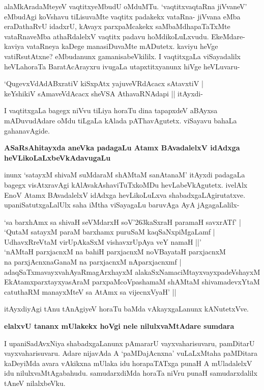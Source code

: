 alaMkAradaMteyeV vaqtitxyeMbudU oMduMTu. `vaqtitxvaqtaRna jiVvaneV' eMbudAgi koVshavu tiLisuvaMte vaqtitx padakekx vataRna- jiVvana eMba eraDathaRvU idadxrU, kAvayx parxpaMcakekx saMbaMdhapaTaTxMte vataRnaveMba athaRdalelxV vaqtitx padavu hoMdikoLuLxvudu. EkeMdare- kaviya vataRneya kaDege manasiDuvaMte mADutetx. kaviyu heVge vatiRsutAtxne? eMbudanunx gamanisabeVkililx. I vaqtitxgaLa viSayadalilx heVLahoraTa BaratAcArayxru ivugaLa utapxtitxyanunx hiVge heVLuvaru-

\begin{shloka}
`QugevxVdAdABxratiV kiSxpAtx yajuveVRdAcacx sAtavxtiV |\\
keYshikiV sAmaveVdAcacx sheVSA AthavaRNAdapi || itAyxdi-
\end{shloka}

I vaqtitxgaLa bagegx niVvu tiLiya horaTu dina tapapxdeV aBAyxsa mADuvudAdare oMdu tiLgaLa kAlada pAThavAgutetx. viSayavu bahaLa gahanavAgide.

{\bf ASaRsAhitayxda aneVka padagaLu Atamx BAvadalelxV idAdxga heVLikoLaLxbeVkAdavugaLu}

inunx `satayxM shivaM suMdaraM shAMtaM sanAtanaM' itAyxdi padagaLa bagegx visAtxravAgi kAlAvakAshaviTuTxkoMDu hevLabeVkAgutetx. ivelAlx EnoV Atamx BAvadalelxV idAdxga hevLikoLuLxva shabadxgaLAgirutatxve. upaniSatutxgaLalUlx saha iMtha viSayagaLu baruvAga AyA jAgagaLalilx-

\begin{shloka}
`sa barxhAmx sa shivaH seVMdarxH soV\char'263kaSxraH paramaH savxrATf' |\\
`QutaM satayxM paraM barxhamx puruSaM kaqSaNxpiMgaLamf |\\
UdhavxRreVtaM virUpAkaSxM vishavxrUpAya veY namaH ||'\\
`nAMtaH parxjacnxM na bahiH parxjacnxM noVBayataH parxjacnxM \\
na parxjAcnxnaGanaM na parxjacnxM nAparxjacnxmf |\\
adaqSaTxmavayxvahAyaRmagArxhayxM alakaSxNamaciMtayxvayxpadeVshayxM \\
EkAtamxparxtayxyasAraM parxpaMcoVpashamaM shAMtaM shivamadevxYtaM \\
catuthaRM manayxMteV sa AtAmx sa vijecnxVyaH' ||
\end{shloka}

itAyxdiyAgi tAnu tAnAgiyeV horaTu baMda vAkayxgaLanunx kANutetxVve.

{\bf elalxvU tananx mUlakekx hoVgi nele nilulxvaMtAdare sumdara}

I upaniSadAvxNiya shabadxgaLanunx pAmararU vayxvaharisuvaru, pamDitarU vayxvaharisuvaru. Adare nijavAda A `paMDajAcnxna' vuLaLxMtaha paMDitara kaDeyiMda avara vAkikxna mUlaka idu horapaTATxga punaH A mUladalelxV idu nilulxvaMtAgabahudu. samudarxdiMda horaTa niVru punaH samudarxdalilx tAneV nilalxbeVku.

